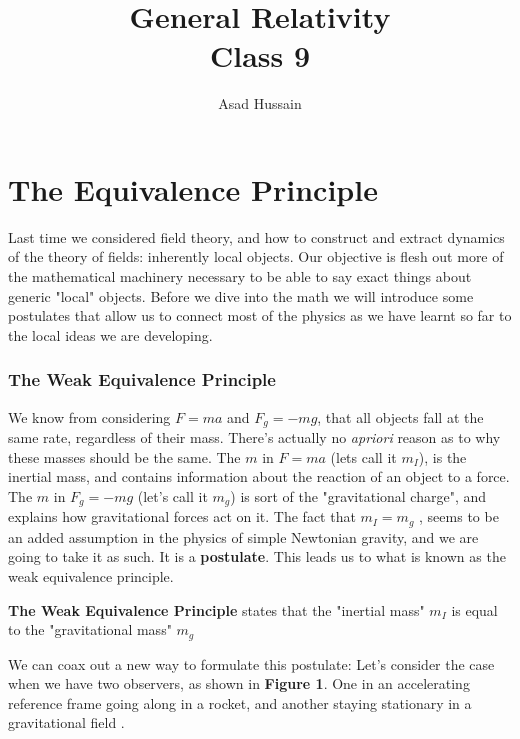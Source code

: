\documentclass[10pt]{article}
\title{{\Huge General Relativity}\\{\Large{Class 9}}} %
\author{Asad Hussain}
\begin{document}
\maketitle
\flushbottom
\newpage
\pagestyle{fancynotes}
    

\part{The Equivalence Principle}

Last time we considered field theory, and how to construct and extract dynamics of the theory of fields: inherently local objects. Our objective is flesh out more of the mathematical machinery necessary to be able to say exact things about generic "local" objects. Before we dive into the math we will introduce some postulates that allow us to connect most of the physics as we have learnt so far to the local ideas we are developing.

\section{The Weak Equivalence Principle}
We know from considering $F = ma$ and $F_g = -mg$, that all objects fall at the same rate, regardless of their mass. There's actually no \textit{apriori} reason as to why these masses should be the same. The $m$ in $F = ma$ (lets call it $m_I$), is the inertial mass, and contains information about the reaction of an object to a force. The $m$ in $F_g = -mg$ (let's call it $m_g$) is sort of the "gravitational charge", and explains how gravitational forces act on it. The fact that $m_I = m_g$ , seems to be an added assumption in the physics of simple Newtonian gravity, and we are going to take it as such. It is a \textbf{postulate}. This leads us to what is known as the weak equivalence principle. \\ 


\begin{tcolorbox}
\textbf{The Weak Equivalence Principle} states that the "inertial mass" $m_I$ is equal to the "gravitational mass" $m_g$
\end{tcolorbox}



We can coax out a new way to formulate this postulate: Let's consider the case when we have two observers, as shown in \textbf{Figure 1}. One in an accelerating reference frame going along in a rocket, and another staying stationary in a gravitational field .
\end{document}
